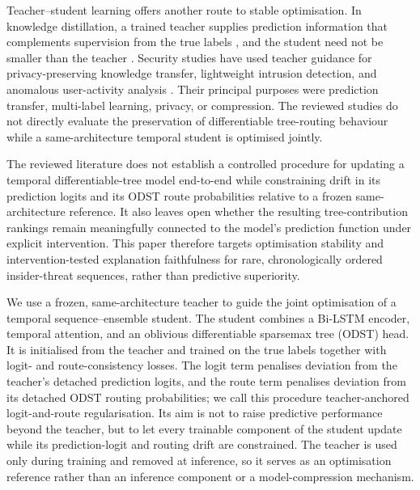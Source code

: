 \smallskip
Teacher--student learning offers another route to stable optimisation. In
knowledge distillation, a trained teacher supplies prediction information
that complements supervision from the true labels
\cite{Hinton2015Distillation,Gou2021KDSurvey}, and the student need not be
smaller than the teacher \cite{Furlanello2018BornAgain}. Security studies
have used teacher guidance for privacy-preserving knowledge transfer,
lightweight intrusion detection, and anomalous user-activity analysis
\cite{Shafee2020Mimic,Hsu2023TeacherStudent,Umair2025KDIDS}. Their principal
purposes were prediction transfer, multi-label learning, privacy, or
compression. The reviewed studies do not directly evaluate the preservation
of differentiable tree-routing behaviour while a same-architecture temporal
student is optimised jointly.

\smallskip
The reviewed literature does not establish a controlled procedure for
updating a temporal differentiable-tree model end-to-end while constraining
drift in its prediction logits and its ODST route probabilities relative to
a frozen same-architecture reference. It also leaves open whether the
resulting tree-contribution rankings remain meaningfully connected to the
model's prediction function under explicit intervention. This paper
therefore targets optimisation stability and intervention-tested explanation
faithfulness for rare, chronologically ordered insider-threat sequences,
rather than predictive superiority.

\smallskip
We use a frozen, same-architecture teacher to guide the joint optimisation
of a temporal sequence--ensemble student. The student combines a Bi-LSTM
encoder, temporal attention, and an oblivious differentiable sparsemax tree
(ODST) head. It is initialised from the teacher and trained on the true
labels together with logit- and route-consistency losses. The logit term
penalises deviation from the teacher's detached prediction logits, and the
route term penalises deviation from its detached ODST routing probabilities;
we call this procedure teacher-anchored logit-and-route regularisation. Its
aim is not to raise predictive performance beyond the teacher, but to let
every trainable component of the student update while its prediction-logit
and routing drift are constrained. The teacher is used only during training
and removed at inference, so it serves as an optimisation reference rather
than an inference component or a model-compression mechanism.

